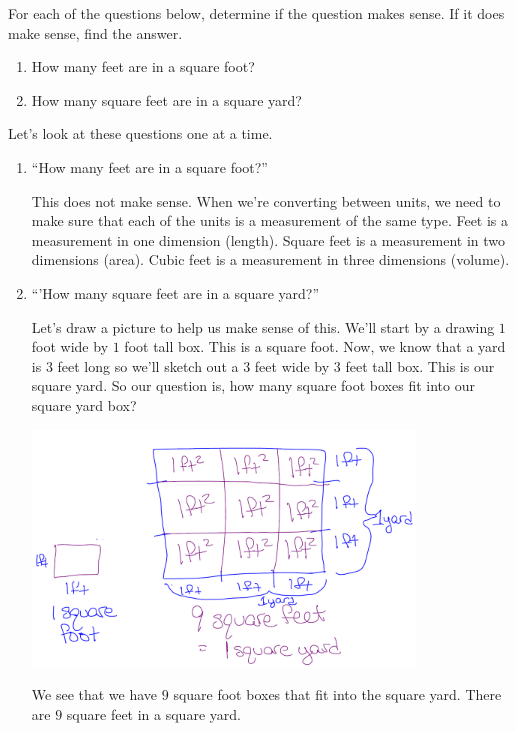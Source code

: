 \documentclass{ximera}
\begin{document}
\begin{example}

For each of the questions below, determine if the question makes sense.  If it does make sense, find the answer.

\begin{enumerate}[label=\alph*.]
\item How many feet are in a square foot?
\item How many square feet are in a square yard?
\end{enumerate}

\begin{explanation}
Let's look at these questions one at a time.
\begin{enumerate}[label=\alph*.]
\item ``How many feet are in a square foot?''  

This does not make sense.  When we're converting between units, we need to make sure that each of the units is a measurement of the same type.  Feet is a measurement in one dimension (length). Square feet is a measurement in two dimensions (area). Cubic feet is a measurement in three dimensions (volume).  \\

\item ``'How many square feet are in a square yard?''  

Let's draw a picture to help us make sense of this. We'll start by a drawing $1$ foot wide by $1$ foot tall box. This is a square foot. Now, we know that a yard is $3$ feet long so we'll sketch out a $3$ feet wide by $3$ feet tall box. This is our square yard. So our question is, how many square foot boxes fit into our square yard box? 

\begin{image}
    \includegraphics[width=4in]{sqftyd.png}
\end{image}

We see that we have $9$ square foot boxes that fit into the square yard.  There are $9$ square feet in a square yard.\\

\end{enumerate}
\end{explanation}
\end{example}
\end{document}
